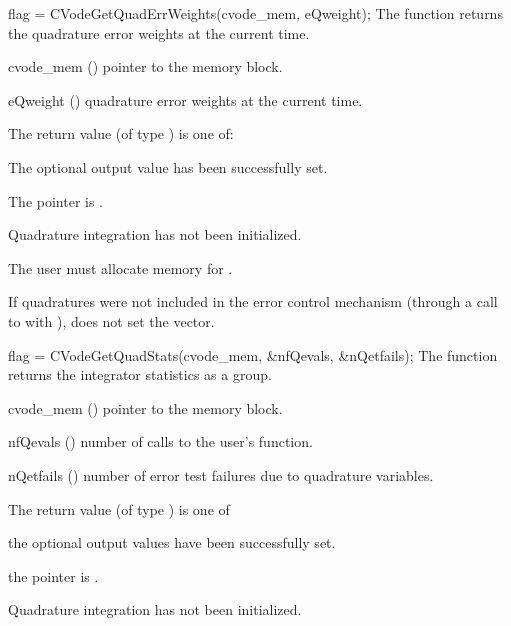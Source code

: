 {}
{
  flag = CVodeGetQuadErrWeights(cvode\_mem, eQweight);
}
{
  The function  returns the quadrature error weights
  at the current time.
}
{
  \begin{args}
  \item[cvode\_mem] ()
    pointer to the {\cvodes} memory block.
  \item[eQweight] ()
    quadrature error weights at the current time.
  \end{args}
}
{
  The return value  (of type ) is one of:
  \begin{args}
  \item[\Id{CV\_SUCCESS}]
    The optional output value has been successfully set.
  \item[\Id{CV\_MEM\_NULL}]
    The  pointer is .
  \item[\Id{CV\_NO\_QUAD}]
    Quadrature integration has not been initialized.
  \end{args}
}
{
  {\warn}The user must allocate memory for .

  If quadratures were not included in the error control mechanism (through a
  call to  with ),
   does not set the  vector.
}
{
  flag = CVodeGetQuadStats(cvode\_mem, \&nfQevals, \&nQetfails);
}
{
  The function  returns the {\cvodes} integrator statistics
  as a group.
}
{
  \begin{args}
  \item[cvode\_mem] ()
    pointer to the {\cvodes} memory block.
  \item[nfQevals] ()
    number of calls to the user's  function.
  \item[nQetfails] ()
    number of error test failures due to quadrature variables.
  \end{args}
}
{
  The return value  (of type ) is one of
  \begin{args}
  \item[\Id{CV\_SUCCESS}]
    the optional output values have been successfully set.
  \item[\Id{CV\_MEM\_NULL}]
    the  pointer is .
  \item[\Id{CV\_NO\_QUAD}]
    Quadrature integration has not been initialized.
  \end{args}
}
{}

